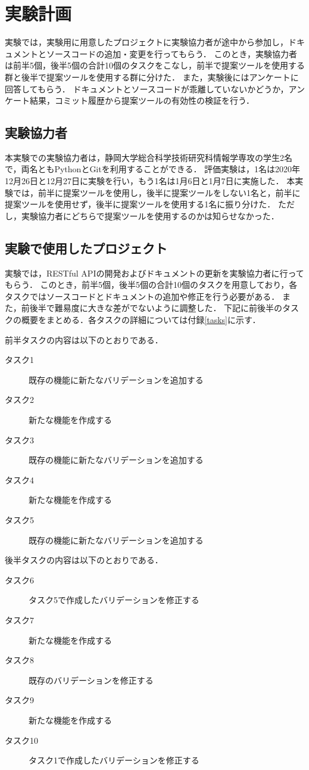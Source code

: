 \section{実験計画}
\label{plan}
実験では，実験用に用意したプロジェクトに実験協力者が途中から参加し，ドキュメントとソースコードの追加・変更を行ってもらう．
このとき，実験協力者は前半5個，後半5個の合計10個のタスクをこなし，前半で提案ツールを使用する群と後半で提案ツールを使用する群に分けた．
また，実験後にはアンケートに回答してもらう．
ドキュメントとソースコードが乖離していないかどうか，アンケート結果，コミット履歴から提案ツールの有効性の検証を行う．

\subsection{実験協力者}
本実験での実験協力者は，静岡大学総合科学技術研究科情報学専攻の学生2名で，両名ともPythonとGitを利用することができる．
評価実験は，1名は2020年12月26日と12月27日に実験を行い，もう1名は1月6日と1月7日に実施した．
本実験では，前半に提案ツールを使用し，後半に提案ツールをしない1名と，前半に提案ツールを使用せず，後半に提案ツールを使用する1名に振り分けた．
ただし，実験協力者にどちらで提案ツールを使用するのかは知らせなかった．

\subsection{実験で使用したプロジェクト}
実験では，RESTful APIの開発およびドキュメントの更新を実験協力者に行ってもらう．
このとき，前半5個，後半5個の合計10個のタスクを用意しており，各タスクではソースコードとドキュメントの追加や修正を行う必要がある．
また，前後半で難易度に大きな差がでないように調整した．
下記に前後半のタスクの概要をまとめる．各タスクの詳細については付録\ref{tasks}に示す．

前半タスクの内容は以下のとおりである．
\begin{description}
    \item[タスク1] 既存の機能に新たなバリデーションを追加する
    \item[タスク2] 新たな機能を作成する
    \item[タスク3] 既存の機能に新たなバリデーションを追加する
    \item[タスク4] 新たな機能を作成する
    \item[タスク5] 既存の機能に新たなバリデーションを追加する
\end{description}

後半タスクの内容は以下のとおりである．
\begin{description}
    \item[タスク6] タスク5で作成したバリデーションを修正する
    \item[タスク7] 新たな機能を作成する
    \item[タスク8] 既存のバリデーションを修正する
    \item[タスク9] 新たな機能を作成する
    \item[タスク10] タスク1で作成したバリデーションを修正する
\end{description}

